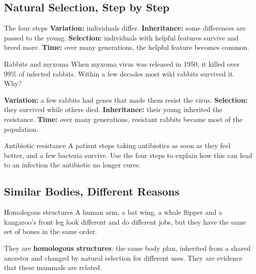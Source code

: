 \label{theory:6}

\subsection{Natural Selection, Step by Step}\label{sub:a6.1}

\begin{skillbox}{The four steps}
\textbf{Variation:} individuals differ. \quad \textbf{Inheritance:} some differences are passed to the young. \quad \textbf{Selection:} individuals with helpful features survive and breed more. \quad \textbf{Time:} over many generations, the helpful feature becomes common.
\end{skillbox}

\begin{workedex}{Rabbits and myxoma}
When myxoma virus was released in 1950, it killed over 99\% of infected rabbits. Within a few decades most wild rabbits survived it. Why?

\smallskip
\textbf{Variation:} a few rabbits had genes that made them resist the virus. \textbf{Selection:} they survived while others died. \textbf{Inheritance:} their young inherited the resistance. \textbf{Time:} over many generations, resistant rabbits became most of the population.
\end{workedex}

\begin{wedo}{Antibiotic resistance}
A patient stops taking antibiotics as soon as they feel better, and a few bacteria survive. Use the four steps to explain how this can lead to an infection the antibiotic no longer cures.
\answerbox{5cm}
\end{wedo}

\subsection{Similar Bodies, Different Reasons}\label{sub:a6.2}

\begin{workedex}{Homologous structures}
A human arm, a bat wing, a whale flipper and a kangaroo's front leg look different and do different jobs, but they have the same set of bones in the same order.

\smallskip
They are \textbf{homologous structures}: the same body plan, inherited from a shared ancestor and changed by natural selection for different uses. They are evidence that these mammals are related.
\end{workedex}

